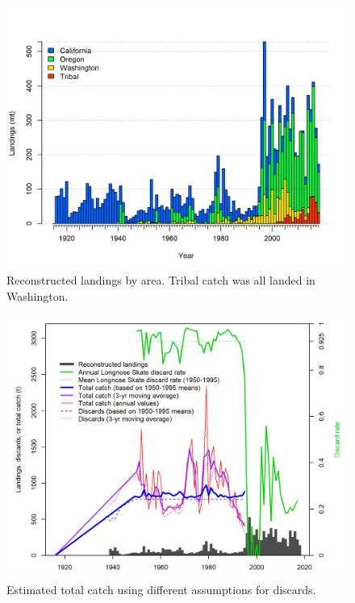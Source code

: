 \documentclass[12pt,]{article}
\begin{document}
\begin{figure}
\centering
\includegraphics{Figures/catch_by_source.png}
\caption{Reconstructed landings by area. Tribal catch was all landed in
Washington. \label{fig:catch_by_state}}
\end{figure}

\begin{figure}
\centering
\includegraphics{Figures/discard_calculations.png}
\caption{Estimated total catch using different assumptions for discards.
\label{fig:discard_calculations}}
\end{figure}
\end{document}
